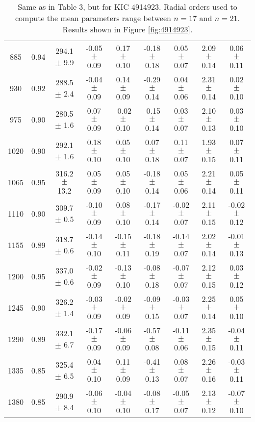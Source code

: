 \documentclass[twocolumn]{aastex61}%
\begin{document}
\begin{table*}[ht]
\begin{tabular}{ccc|ccccc|c}
885 & 0.94 & 294.1 $\pm$ 9.9 & -0.05 $\pm$ 0.09 & 0.17 $\pm$ 0.10 & -0.18 $\pm$ 0.18 & 0.05 $\pm$ 0.07 & 2.09 $\pm$ 0.14 & 0.06 $\pm$ 0.11\\
930 & 0.92 & 288.5 $\pm$ 2.4 & -0.04 $\pm$ 0.09 & 0.14 $\pm$ 0.09 & -0.29 $\pm$ 0.14 & 0.04 $\pm$ 0.06 & 2.31 $\pm$ 0.14 & 0.02 $\pm$ 0.10\\
975 & 0.90 & 280.5 $\pm$ 1.6 & 0.07 $\pm$ 0.09 & -0.02 $\pm$ 0.10 & -0.15 $\pm$ 0.14 & 0.03 $\pm$ 0.07 & 2.10 $\pm$ 0.13 & 0.03 $\pm$ 0.10\\
1020 & 0.90 & 292.1 $\pm$ 1.6 & 0.18 $\pm$ 0.10 & 0.05 $\pm$ 0.10 & 0.07 $\pm$ 0.18 & 0.11 $\pm$ 0.07 & 1.93 $\pm$ 0.15 & 0.07 $\pm$ 0.11\\
1065 & 0.95 & 316.2 $\pm$ 13.2 & 0.05 $\pm$ 0.09 & 0.05 $\pm$ 0.10 & -0.18 $\pm$ 0.14 & 0.05 $\pm$ 0.06 & 2.21 $\pm$ 0.14 & 0.05 $\pm$ 0.11\\
1110 & 0.90 & 309.7 $\pm$ 0.5 & -0.10 $\pm$ 0.09 & 0.08 $\pm$ 0.10 & -0.17 $\pm$ 0.14 & -0.02 $\pm$ 0.07 & 2.11 $\pm$ 0.15 & -0.02 $\pm$ 0.12\\
1155 & 0.89 & 318.7 $\pm$ 0.6 & -0.14 $\pm$ 0.10 & -0.15 $\pm$ 0.11 & -0.18 $\pm$ 0.19 & -0.14 $\pm$ 0.07 & 2.02 $\pm$ 0.14 & -0.01 $\pm$ 0.13\\
1200 & 0.95 & 337.0 $\pm$ 0.6 & -0.02 $\pm$ 0.09 & -0.13 $\pm$ 0.10 & -0.08 $\pm$ 0.18 & -0.07 $\pm$ 0.07 & 2.12 $\pm$ 0.15 & 0.03 $\pm$ 0.12\\
1245 & 0.90 & 326.2 $\pm$ 1.4 & -0.03 $\pm$ 0.09 & -0.02 $\pm$ 0.09 & -0.09 $\pm$ 0.15 & -0.03 $\pm$ 0.07 & 2.25 $\pm$ 0.14 & 0.05 $\pm$ 0.10\\
1290 & 0.89 & 332.1 $\pm$ 6.7 & -0.17 $\pm$ 0.09 & -0.06 $\pm$ 0.09 & -0.57 $\pm$ 0.08 & -0.11 $\pm$ 0.06 & 2.35 $\pm$ 0.15 & -0.04 $\pm$ 0.11\\
1335 & 0.85 & 325.4 $\pm$ 6.5 & 0.04 $\pm$ 0.10 & 0.11 $\pm$ 0.09 & -0.41 $\pm$ 0.13 & 0.08 $\pm$ 0.07 & 2.26 $\pm$ 0.16 & -0.03 $\pm$ 0.11\\
1380 & 0.85 & 290.9 $\pm$ 8.4 & -0.06 $\pm$ 0.10 & -0.04 $\pm$ 0.10 & -0.08 $\pm$ 0.17 & -0.05 $\pm$ 0.07 & 2.13 $\pm$ 0.12 & -0.07 $\pm$ 0.10\\
\end{tabular}
\caption{Same as in Table 3, but for KIC 4914923. Radial orders used to compute the mean parameters range between $n=17$ and $n=21$. Results shown in Figure \ref{fig:4914923}.}\label{tab:4914923}
\end{table*}
\end{document}
